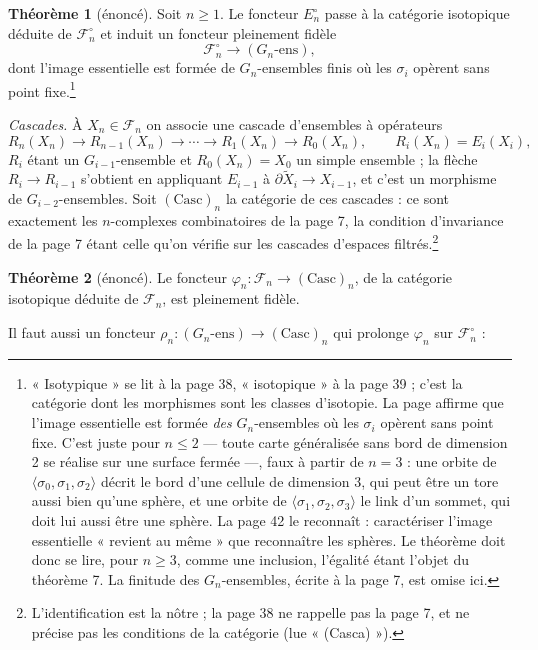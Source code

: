 \documentclass[11pt,a4paper]{article}
\begin{document}
\textbf{Théorème 1} (énoncé). Soit $n \geqslant 1$. Le foncteur
$E_n^\circ$ passe à la catégorie isotopique déduite de $\mathcal{F}_n^\circ$
et induit un foncteur pleinement fidèle
\[
  \mathcal{F}_n^\circ \longrightarrow (G_n\text{-ens}) ,
\]
dont l'image essentielle est formée de $G_n$-ensembles finis où les $\sigma_i$
opèrent sans point fixe.\footnote{« Isotypique » se lit à la page 38,
« isotopique » à la page 39 ; c'est la catégorie dont les morphismes sont les
classes d'isotopie. La page affirme que l'image essentielle est formée
\emph{des} $G_n$-ensembles où les $\sigma_i$ opèrent sans point fixe. C'est
juste pour $n \leqslant 2$ --- toute carte généralisée sans bord de dimension 2
se réalise sur une surface fermée ---, faux à partir de $n = 3$ : une orbite
de $\langle \sigma_0, \sigma_1, \sigma_2 \rangle$ décrit le bord d'une cellule
de dimension 3, qui peut être un tore aussi bien qu'une sphère, et une orbite
de $\langle \sigma_1, \sigma_2, \sigma_3 \rangle$ le link d'un sommet, qui doit
lui aussi être une sphère. La page 42 le reconnaît : caractériser l'image
essentielle « revient au même » que reconnaître les sphères. Le théorème doit
donc se lire, pour $n \geqslant 3$, comme une inclusion, l'égalité étant
l'objet du théorème 7. La finitude des $G_n$-ensembles, écrite à la page 7,
est omise ici.}

\emph{Cascades.} À $X_n \in \mathcal{F}_n$ on associe une cascade d'ensembles
à opérateurs
\[
  R_n(X_n) \to R_{n-1}(X_n) \to \cdots \to R_1(X_n) \to R_0(X_n),
  \qquad R_i(X_n) = E_i(X_i) ,
\]
$R_i$ étant un $G_{i-1}$-ensemble et $R_0(X_n) = X_0$ un simple ensemble ; la
flèche $R_i \to R_{i-1}$ s'obtient en appliquant $E_{i-1}$ à
$\partial\widetilde{X}_i \to X_{i-1}$, et c'est un morphisme de
$G_{i-2}$-ensembles. Soit $(\mathrm{Casc})_n$ la catégorie de ces cascades :
ce sont exactement les $n$-complexes combinatoires de la page 7, la condition
d'invariance de la page 7 étant celle qu'on vérifie sur les cascades d'espaces
filtrés.\footnote{L'identification est la nôtre ; la page 38 ne rappelle pas
la page 7, et ne précise pas les conditions de la catégorie (lue
« (Casca) »).}

\textbf{Théorème 2} (énoncé). Le foncteur $\varphi_n : \mathcal{F}_n \to
(\mathrm{Casc})_n$, de la catégorie isotopique déduite de $\mathcal{F}_n$, est
pleinement fidèle.

Il faut aussi un foncteur $\rho_n : (G_n\text{-ens}) \to (\mathrm{Casc})_n$
qui prolonge $\varphi_n$ sur $\mathcal{F}_n^\circ$ :
\end{document}
